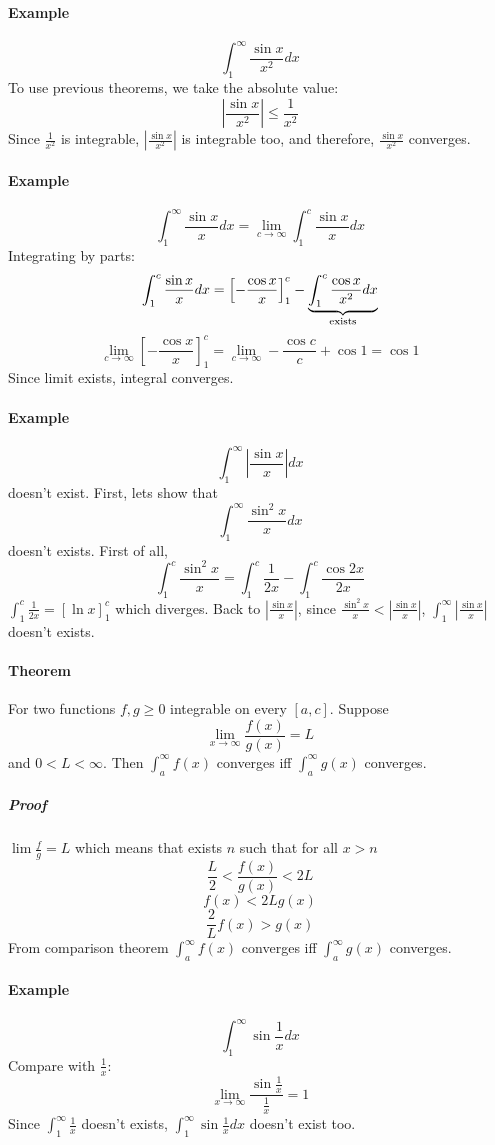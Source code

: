 \paragraph{Example}
$$\int_1^\infty \frac{\sin x}{x^2} dx $$
To use previous theorems, we take the absolute value: $$\left| \frac{\sin x}{x^2} \right| \leq \frac{1}{x^2}$$ Since $\frac{1}{x^2}$ is integrable, $\left| \frac{\sin x}{x^2} \right|$ is integrable too, and therefore, $\frac{\sin x}{x^2}$ converges.
\paragraph{Example}

$$\int_1^\infty \frac{\sin x}{x} dx = \lim_{c\to \infty} \int_1^c \frac{\sin x}{x} dx $$
Integrating by parts:
$$\int_1^c \frac{\sin x}{x} dx  = \left[-\frac{\cos x}{x}\right]_1^c - \underbrace{\int_1^c \frac{\cos x}{x^2} dx}_{\parbox{1cm}{\scriptsize \centering exists}}$$
$$\lim_{c \to \infty} \left[-\frac{\cos x}{x}\right]_1^c = \lim_{c \to \infty} -\frac{\cos c}{c} + \cos 1 = \cos 1$$
Since limit exists, integral converges.
\paragraph{Example}
$$\int_1^\infty \left|\frac{\sin x}{x}\right| dx$$ doesn't exist. First, lets show that $$\int_1^\infty \frac{\sin^2 x}{x} dx$$ doesn't exists.
First of all, $$\int_1^c \frac{\sin^2 x}{x} = \int_1^c \frac{1}{2x} - \int_1^c \frac{\cos 2x}{2x}$$
$ \int_1^c \frac{1}{2x} = \left[\ln x\right]_1^c$ which diverges. Back to $\left|\frac{\sin x}{x}\right|$, since   $\frac{\sin^2 x}{x}<\left|\frac{\sin x}{x}\right|$, $\int_1^\infty \left|\frac{\sin x}{x}\right|$ doesn't exists.
\paragraph{Theorem} For two functions $f,g \geq 0$ integrable on every $[a,c]$. Suppose $$\lim_{x \to \infty} \frac{f(x)}{g(x)} = L$$ and $0 < L < \infty$. Then $\int_a^\infty f(x)$ converges iff $\int_a^\infty g(x)$ converges.
\subparagraph{Proof} $\lim \frac{f}{g} = L$ which means that exists $n$ such that for all $x>n$ $$\frac{L}{2} < \frac{f(x)}{g(x)} < 2L$$
$$f(x) < 2Lg(x)$$
$$\frac{2}{L}f(x) > g(x)$$
From comparison theorem  $\int_a^\infty f(x)$ converges iff $\int_a^\infty g(x)$ converges.
\paragraph{Example}
$$\int_1^\infty \sin \frac{1}{x}dx$$
Compare with $\frac{1}{x}$:
$$\lim_{x\to\infty} \frac{\sin\frac{1}{x}}{\frac{1}{x}} = 1$$
Since $\int_1^\infty \frac{1}{x}$ doesn't exists, $\int_1^\infty \sin \frac{1}{x}dx$ doesn't exist too.
